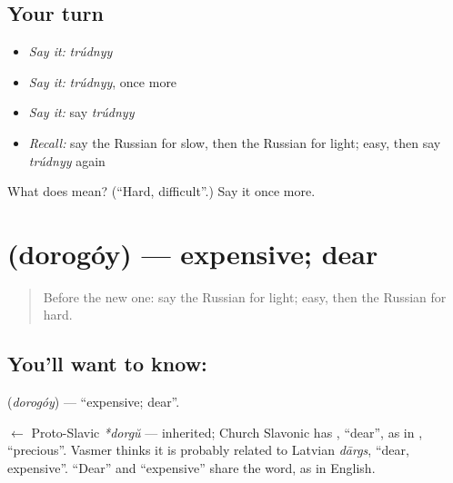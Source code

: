 \subsection*{Your turn}
\begin{itemize}
\raggedright
  \item \emph{Say it:} \emph{trúdnyy}
  \item \emph{Say it:} \emph{trúdnyy}, once more
  \item \emph{Say it:} say \emph{trúdnyy}
  \item \emph{Recall:} say the Russian for slow, then the Russian for light; easy, then say \emph{trúdnyy} again
\end{itemize}

\begin{tcolorbox}[breakable,colback=teal!4,colframe=teal!35!black,title={Before you move on}]
What does  mean? (\textquotedblleft{}Hard, difficult\textquotedblright{}.) Say it once more.
\end{tcolorbox}
\section[\texorpdfstring{\ru{дорогой} (dorogóy)}{дорогой (dorogóy)}]{ (dorogóy) — expensive; dear}

\label{lesson:RU-C67-expensive}



\begin{quote}
Before the new one: say the Russian for light; easy, then the Russian for hard.
\end{quote}

\subsection*{You'll want to know: }
\textbf{} (\emph{dorogóy}) — \textquotedblleft{}expensive; dear\textquotedblright{}.

\begin{cousinweb}
\textbf{} $\leftarrow$ Proto-Slavic \emph{*dorgŭ} — inherited; Church Slavonic has \emph{}, \textquotedblleft{}dear\textquotedblright{}, as in \emph{}, \textquotedblleft{}precious\textquotedblright{}. Vasmer thinks it is probably related to Latvian \emph{dārgs}, \textquotedblleft{}dear, expensive\textquotedblright{}. \textquotedblleft{}Dear\textquotedblright{} and \textquotedblleft{}expensive\textquotedblright{} share the word, as in English.
\end{cousinweb}

